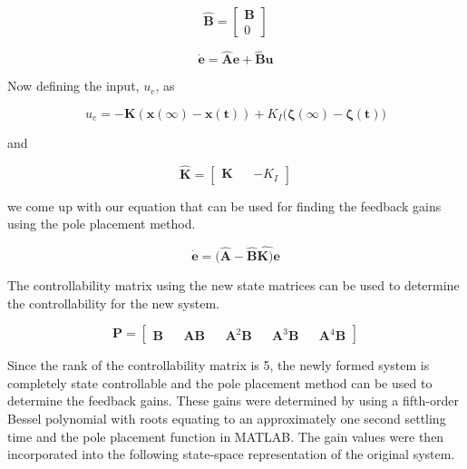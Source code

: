 \documentclass[titlepage]{article}
\begin{document}
\begin{equation}
    \mathbf{\hat{B}} = 
    \begin{bmatrix}
        \textbf{B}\\
        0
    \end{bmatrix}
\end{equation}

\begin{equation}
    \mathbf{\dot e} = \mathbf{\hat{A}e} + \mathbf{\hat{B}u}
\end{equation}

Now defining the input, $u_e$, as

\begin{equation}
    u_{e} = \mathbf{-K(x(\infty) - x(t))} + K_{I}(\mathbf{\zeta(\infty)-\zeta(t))}
\end{equation}

and

\begin{equation}
    \mathbf{\hat{K}} = 
    \begin{bmatrix}
        \textbf{K} && -K_{I}
    \end{bmatrix}
\end{equation}

we come up with our equation that can be used for finding the feedback gains using the pole placement method.

\begin{equation}
    \mathbf{\dot e} = \mathbf{(\hat{A}-\hat{B}\hat{K)}e}
\end{equation}

The controllability matrix using the new state matrices can be used to determine the controllability for the new system.

\begin{equation}
    \textbf{P} = 
    \begin{bmatrix}
        \textbf{B} && \textbf{AB} && \textbf{A}^2\textbf{B} && \textbf{A}^3\textbf{B} && \textbf{A}^4\textbf{B}
    \end{bmatrix}
\end{equation}

Since the rank of the controllability matrix is 5, the newly formed system is completely state controllable and the pole placement method can be used to determine the feedback gains. These gains were determined by using a fifth-order Bessel polynomial with roots equating to an approximately one second settling time and the pole placement function in MATLAB. The gain values were then incorporated into the following state-space representation of the original system.
\end{document}
